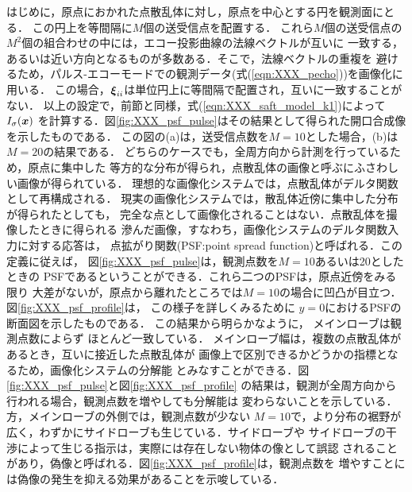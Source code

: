 はじめに，原点におかれた点散乱体に対し，原点を中心とする円を観測面にとる．
この円上を等間隔に$M$個の送受信点を配置する．
これら$M$個の送受信点の$M^2$個の組合わせの中には，エコー投影曲線の法線ベクトルが互いに
一致する，あるいは近い方向となるものが多数ある．そこで，法線ベクトルの重複を
避けるため，パルス-エコーモードでの観測データ(式(\ref{eqn:XXX_pecho}))を画像化に用いる．
この場合，$\mbox{\boldmath $\xi$}_{ii}$は単位円上に等間隔で配置され，互いに一致することがない．
以上の設定で，前節と同様，式(\ref{eqn:XXX_saft_model_k1})によって$I_\sigma(\mbox{\boldmath $x$})$
を計算する．図\ref{fig:XXX_psf_pulse}はその結果として得られた開口合成像を示したものである．
この図の(a)は，送受信点数を$M=10$とした場合，(b)は$M=20$の結果である．
どちらのケースでも，全周方向から計測を行っているため，原点に集中した
等方的な分布が得られ，点散乱体の画像と呼ぶにふさわしい画像が得られている．
理想的な画像化システムでは，点散乱体がデルタ関数として再構成される．
現実の画像化システムでは，散乱体近傍に集中した分布が得られたとしても，
完全な点として画像化されることはない．点散乱体を撮像したときに得られる
滲んだ画像，すなわち，画像化システムのデルタ関数入力に対する応答は，
点拡がり関数(PSF:point spread function)と呼ばれる．この定義に従えば，
図\ref{fig:XXX_psf_pulse}は，観測点数を$M=10$あるいは20としたときの
PSFであるということができる．これら二つのPSFは，原点近傍をみる限り
大差がないが，原点から離れたところでは$M=10$の場合に凹凸が目立つ．
図\ref{fig:XXX_psf_profile}は， この様子を詳しくみるために 
$y=0$におけるPSFの断面図を示したものである．
この結果から明らかなように， メインローブは観測点数によらず
ほとんど一致している．
メインローブ幅は，複数の点散乱体があるとき，互いに接近した点散乱体が
画像上で区別できるかどうかの指標となるため，画像化システムの分解能
とみなすことができる．図\ref{fig:XXX_psf_pulse}と図\ref{fig:XXX_psf_profile}
の結果は，観測が全周方向から行われる場合，観測点数を増やしても分解能は
変わらないことを示している． 方，メインローブの外側では，観測点数が少ない
$M=10$で，より分布の裾野が広く，わずかにサイドローブも生じている．サイドローブや
サイドローブの干渉によって生じる指示は，実際には存在しない物体の像として誤認
されることがあり，偽像と呼ばれる．図\ref{fig:XXX_psf_profile}は，観測点数を
増やすことには偽像の発生を抑える効果があることを示唆している．

